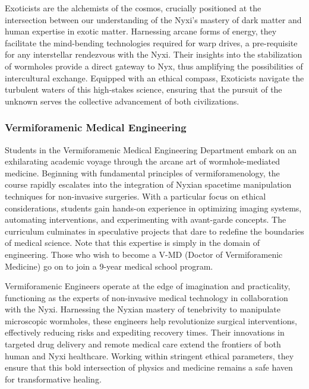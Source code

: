 Exoticists are the alchemists of the cosmos, crucially positioned at the
intersection between our understanding of the Nyxi's mastery of dark matter and
human expertise in exotic matter. Harnessing arcane forms of energy, they
facilitate the mind-bending technologies required for warp drives, a
pre-requisite for any interstellar rendezvous with the Nyxi. Their insights
into the stabilization of wormholes provide a direct gateway to Nyx, thus
amplifying the possibilities of intercultural exchange. Equipped with an
ethical compass, Exoticists navigate the turbulent waters of this high-stakes
science, ensuring that the pursuit of the unknown serves the collective
advancement of both civilizations.

\subsubsection{Vermiforamenic Medical Engineering}
Students in the Vermiforamenic Medical Engineering Department embark on an
exhilarating academic voyage through the arcane art of wormhole-mediated
medicine. Beginning with fundamental principles of vermiforamenology, the
course rapidly escalates into the integration of Nyxian spacetime manipulation
techniques for non-invasive surgeries. With a particular focus on ethical
considerations, students gain hands-on experience in optimizing imaging
systems, automating interventions, and experimenting with avant-garde concepts.
The curriculum culminates in speculative projects that dare to redefine the
boundaries of medical science. Note that this expertise is simply in the domain
of engineering. Those who wish to become a V-MD (Doctor of Vermiforamenic
Medicine) go on to join a 9-year medical school program.

Vermiforamenic Engineers operate at the edge of imagination and practicality,
functioning as the experts of non-invasive medical technology in collaboration
with the Nyxi. Harnessing the Nyxian mastery of tenebrivity to manipulate
microscopic wormholes, these engineers help revolutionize surgical
interventions, effectively reducing risks and expediting recovery times. Their
innovations in targeted drug delivery and remote medical care extend the
frontiers of both human and Nyxi healthcare. Working within stringent ethical
parameters, they ensure that this bold intersection of physics and medicine
remains a safe haven for transformative healing.

\begin{center}
\end{center}

